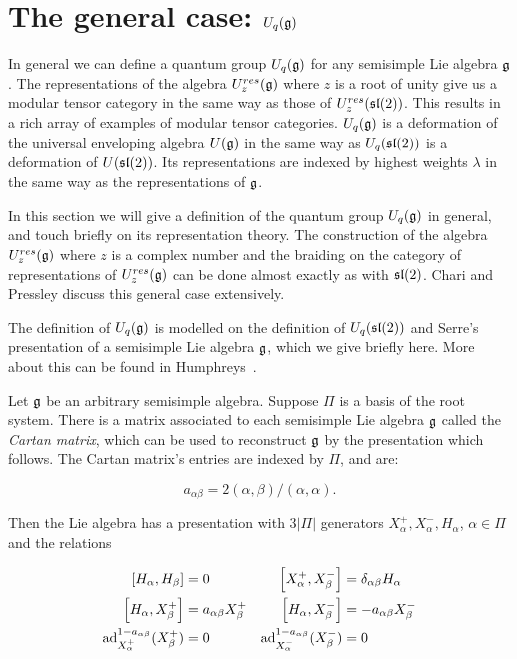 \section{The general case: $U_q(\mathfrak{g})$}
\label{section:U_q(g)}


In general we can define a quantum group $U_q(\mathfrak{g})$ for any semisimple Lie
algebra $\mathfrak{g}$. The representations of the algebra $U_z^{res}(\mathfrak{g})$
where $z$ is a root of unity give us a modular tensor category in the same way
as those of $U_z^{res}(\mathfrak{sl}(2))$. This results in a rich array of examples of
modular tensor categories. $U_q(\mathfrak{g})$ is a deformation of the
universal enveloping algebra $U(\mathfrak{g})$ in the same way as $U_q(\mathfrak{sl}(2))$ is a
deformation of $U(\mathfrak{sl}(2))$. Its representations are indexed by highest weights
$\lambda$ in the same way as the representations of $\mathfrak{g}$. 

In this section we will give a definition of the quantum group $U_q(\mathfrak{g})$ in
general, and touch briefly on its representation theory. The construction of
the algebra $U_z^{res}(\mathfrak{g})$ where $z$ is a complex number and the braiding
on the category of representations of $U_z^{res}(\mathfrak{g})$ can be done almost
exactly as with $\mathfrak{sl}(2)$. Chari and Pressley \cite{CP} discuss this general
case extensively. 

The definition of $U_q(\mathfrak{g})$ is modelled on the definition of $U_q(\mathfrak{sl}(2))$
and Serre's presentation of a semisimple Lie algebra $\mathfrak{g}$, which we give
briefly here. More about this can be found in Humphreys~\cite{Humphreys1973}.

Let $\mathfrak{g}$ be an arbitrary semisimple algebra. Suppose $\Pi$ is a basis of
the root system. There is a matrix associated to each semisimple Lie algebra
$\mathfrak{g}$ called the \emph{Cartan matrix}, which can be used to reconstruct
$\mathfrak{g}$ by the presentation which follows. The Cartan matrix's entries are
indexed by $\Pi$, and are:

    \begin{equation}
        a_{\alpha\beta} = 2(\alpha, \beta) / (\alpha, \alpha).
    \end{equation}

    Then the Lie algebra has a presentation with $3|\Pi|$ generators
    $X^+_\alpha, X^-_\alpha, H_\alpha$, $\alpha \in \Pi$ and the relations 

    \begin{align}
        \left[ H_\alpha, H_\beta \right] &= 0       &   \left[ X^+_\alpha, X^-_\beta \right] &= \delta_{\alpha\beta} H_\alpha \\
        \left[ H_\alpha, X^+_\beta \right] &= a_{\alpha\beta} X^+_\beta  &   \left[ H_\alpha, X^-_\beta \right] &= -a_{\alpha\beta} X^-_\beta  \\
        \operatorname{ad}_{X^+_\alpha}^{1-a_{\alpha\beta}} (X^+_\beta) &= 0 & \operatorname{ad}_{X^-_\alpha}^{1-a_{\alpha\beta}} (X^-_\beta) &= 0 \label{eqn:ad}
    \end{align}

